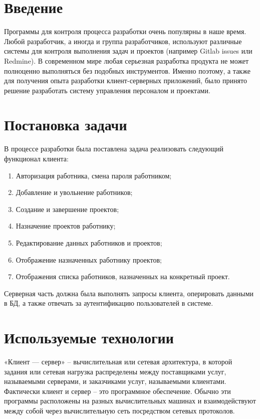\documentclass[14pt,a4paper,openbib]{extarticle}
\numberwithin{equation}{section}
\begin{document}
\pagebreak
\section*{Введение}
Программы для контроля процесса разработки очень популярны в наше время. Любой разработчик, а иногда и группа разработчиков, используют различные системы для контроля выполнения задач и проектов (например Gitlab issues или Redmine). В современном мире любая серьезная разработка продукта не может полноценно выполняться без подобных инструментов. Именно поэтому, а также для получения опыта разработки клиент-серверных приложений, было принято решение разработать систему управления персоналом и проектами.


\newpage
\section{Постановка задачи}
В процессе разработки была поставлена задача реализовать следующий функционал клиента:
\begin{enumerate} 
    \item Авторизация работника, смена пароля работником;
    \item Добавление и увольнение работников;
    \item Создание и завершение проектов;
    \item Назначение проектов работнику;
    \item Редактирование данных работников и проектов;
    \item Отображение назначенных работнику проектов;
    \item Отображения списка работников, назначенных на конкретный проект.
\end{enumerate}
Серверная часть должна была выполнять запросы клиента, оперировать данными в БД, а также отвечать за аутентификацию пользователей в системе.


\newpage
\section{Используемые технологии}
«Клиент — сервер» – вычислительная или сетевая архитектура, в которой задания или сетевая нагрузка распределены между поставщиками услуг, называемыми серверами, и заказчиками услуг, называемыми клиентами. Фактически клиент и сервер – это программное обеспечение. Обычно эти программы расположены на разных вычислительных машинах и взаимодействуют между собой через вычислительную сеть посредством сетевых протоколов.
\end{document}
